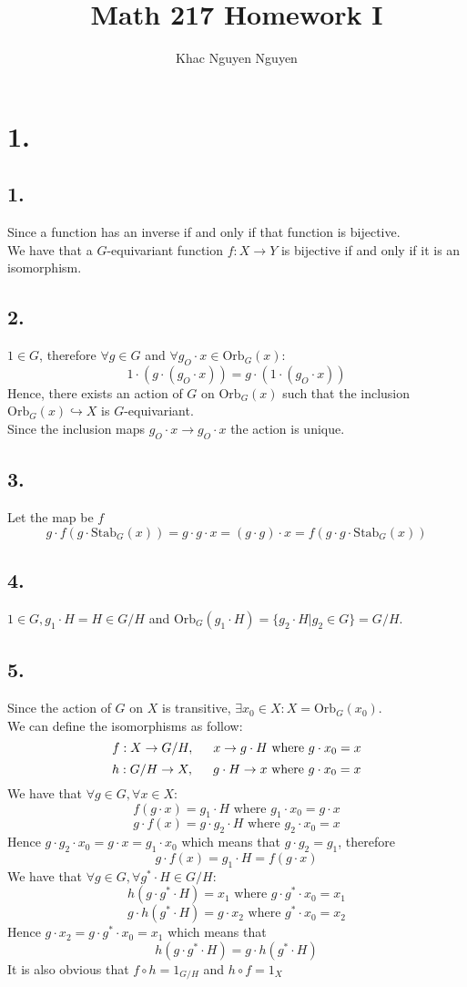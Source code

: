 \documentclass[11pt]{article}
\title{\textbf{Math 217 Homework I}}
\author{Khac Nguyen Nguyen}
\date{}
\begin{document}
\section*{1.}
\subsection*{1.}
Since a function has an inverse if and only if that function is bijective. \\
We have that a $G$-equivariant function $f: X \to Y$ is bijective if and only if it is an isomorphism.
\subsection*{2.}
$1 \in G$, therefore $\forall g \in G$ and $\forall g_O \cdot x \in \text{Orb}_G(x):$ 
\[
    1 \cdot (g \cdot (g_O \cdot x)) = g \cdot (1 \cdot (g_O \cdot x))
\]
Hence, there exists an action of $G$ on $\text{Orb}_G(x)$ such that 
the inclusion $\text{Orb}_G(x) \hookrightarrow X$ is $G$-equivariant. \\
Since the inclusion maps $g_O \cdot x \to g_O \cdot x$ the action is unique.
\subsection*{3.}
Let the map be $f$  
\[
    g \cdot f(g \cdot \text{Stab}_G(x)) = g \cdot g \cdot x = (g \cdot g) \cdot x = f(g \cdot g \cdot \text{Stab}_G(x))
\]
\subsection*{4.}
$1 \in G, g_1 \cdot H = H \in G/H$ and $\text{Orb}_G(g_1 \cdot H) = \{g_2 \cdot H | g_2 \in G\} = G/H$.
\subsection*{5.}
Since the action of $G$ on $X$ is transitive, $\exists x_0 \in X: X = \text{Orb}_G(x_0)$. \\
We can define the isomorphisms as follow: 
\[
    f: X \to G/H, \indent x \to g \cdot H \text{ where } g \cdot x_0 = x    
\]
\[
    h: G/H \to X, \indent g \cdot H \to x \text{ where } g \cdot x_0 = x    
\]
We have that $\forall g \in G, \forall x \in X$:
\[
    f(g \cdot x ) = g_1 \cdot H \text{ where } g_1 \cdot x_0 = g \cdot x   
\]
\[
    g \cdot f(x) = g \cdot g_2 \cdot H \text{ where } g_2 \cdot x_0 = x    
\]
Hence $g \cdot g_2 \cdot x_0 = g \cdot x = g_1 \cdot x_0$ which means that $g \cdot g_2 = g_1$, therefore
\[
    g \cdot f(x) = g_1 \cdot H = f(g \cdot x)    
\]
We have that $\forall g \in G, \forall g^* \cdot H \in G/H$:
\[
    h(g \cdot g^* \cdot H) = x_1 \text{ where } g \cdot g^* \cdot x_0 = x_1 
\]
\[
    g \cdot h(g^* \cdot H) = g \cdot x_2 \text{ where } g^* \cdot x_0 = x_2    
\]
Hence $g \cdot x_2 = g \cdot g^* \cdot x_0 = x_1$ which means that 
\[
h(g \cdot g^* \cdot H) = g \cdot h(g^* \cdot H)   
\]
It is also obvious that $f\circ h = 1_{G/H}$ and $h \circ f = 1_X$
\end{document}
